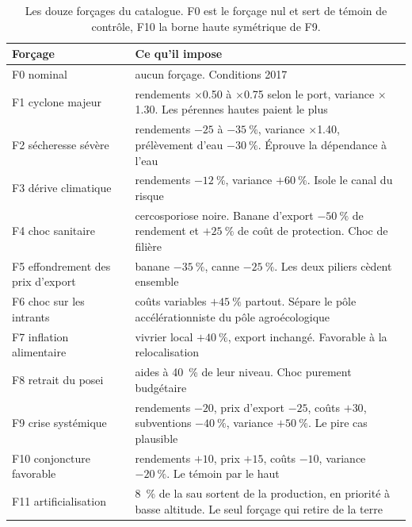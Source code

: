 \begin{table}[h]
  \centering
  \caption{Les douze forçages du catalogue. F0 est le forçage nul et sert de témoin de
  contrôle, F10 la borne haute symétrique de F9.}
  \label{tab:ann-forcages}
  \scriptsize
  \setlength{\tabcolsep}{4pt}
  \begin{tabularx}{\textwidth}{@{}p{31mm}X@{}}
    \toprule
    \textbf{Forçage} & \textbf{Ce qu'il impose} \\
    \midrule
    F0 nominal & aucun forçage. Conditions 2017 \\
    F1 cyclone majeur & rendements $\times$\num{0.50} à $\times$\num{0.75} selon le port,
      variance $\times$\num{1.30}. Les pérennes hautes paient le plus \\
    F2 sécheresse sévère & rendements $-\num{25}$ à $-\SI{35}{\percent}$, variance
      $\times$\num{1.40}, prélèvement d'eau $-\SI{30}{\percent}$. Éprouve la dépendance à
      l'eau \\
    F3 dérive climatique & rendements $-\SI{12}{\percent}$, variance $+\SI{60}{\percent}$.
      Isole le canal du risque \\
    F4 choc sanitaire & cercosporiose noire. Banane d'export $-\SI{50}{\percent}$ de rendement
      et $+\SI{25}{\percent}$ de coût de protection. Choc de filière \\
    F5 effondrement des prix d'export & banane $-\SI{35}{\percent}$, canne
      $-\SI{25}{\percent}$. Les deux piliers cèdent ensemble \\
    F6 choc sur les intrants & coûts variables $+\SI{45}{\percent}$ partout. Sépare le pôle
      accélérationniste du pôle agroécologique \\
    F7 inflation alimentaire & vivrier local $+\SI{40}{\percent}$, export inchangé. Favorable
      à la relocalisation \\
    F8 retrait du \gls{posei} & aides à \SI{40}{\percent} de leur niveau. Choc purement
      budgétaire \\
    F9 crise systémique & rendements $-\num{20}$, prix d'export $-\num{25}$, coûts $+\num{30}$,
      subventions $-\SI{40}{\percent}$, variance $+\SI{50}{\percent}$. Le pire cas plausible \\
    F10 conjoncture favorable & rendements $+\num{10}$, prix $+\num{15}$, coûts $-\num{10}$,
      variance $-\SI{20}{\percent}$. Le témoin par le haut \\
    F11 artificialisation & \SI{8}{\percent} de la \gls{sau} sortent de la production, en
      priorité à basse altitude. Le seul forçage qui retire de la terre \\
    \bottomrule
  \end{tabularx}
\end{table}

